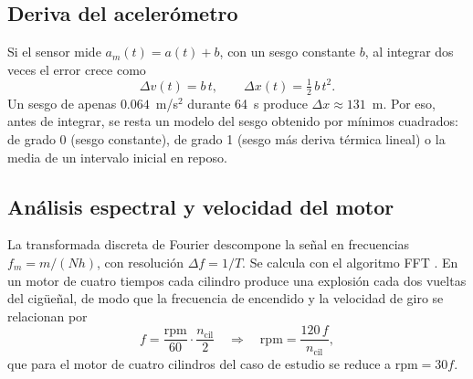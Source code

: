 \subsection{Deriva del acelerómetro}
\label{sec:deriva}

Si el sensor mide $a_m(t) = a(t) + b$, con un sesgo constante $b$, al integrar dos veces el error crece como
\begin{equation}
  \Delta v(t) = b\,t, \qquad \Delta x(t) = \tfrac{1}{2}\,b\,t^2 .
  \label{eq:deriva}
\end{equation}
Un sesgo de apenas $0.064$~m/s$^2$ durante 64~s produce $\Delta x \approx 131$~m. Por eso, antes de integrar, se resta un modelo del sesgo obtenido por mínimos cuadrados: de grado 0 (sesgo constante), de grado 1 (sesgo más deriva térmica lineal) o la media de un intervalo inicial en reposo.

\subsection{Análisis espectral y velocidad del motor}

La transformada discreta de Fourier descompone la señal en frecuencias $f_m = m/(Nh)$, con resolución $\Delta f = 1/T$. Se calcula con el algoritmo FFT \parencite{cooley1965}. En un motor de cuatro tiempos cada cilindro produce una explosión cada dos vueltas del cigüeñal, de modo que la frecuencia de encendido y la velocidad de giro se relacionan por
\begin{equation}
  f = \frac{\text{rpm}}{60}\cdot\frac{n_{\text{cil}}}{2}
  \quad\Longrightarrow\quad
  \text{rpm} = \frac{120\,f}{n_{\text{cil}}} ,
  \label{eq:rpm}
\end{equation}
que para el motor de cuatro cilindros del caso de estudio se reduce a $\text{rpm} = 30f$.
